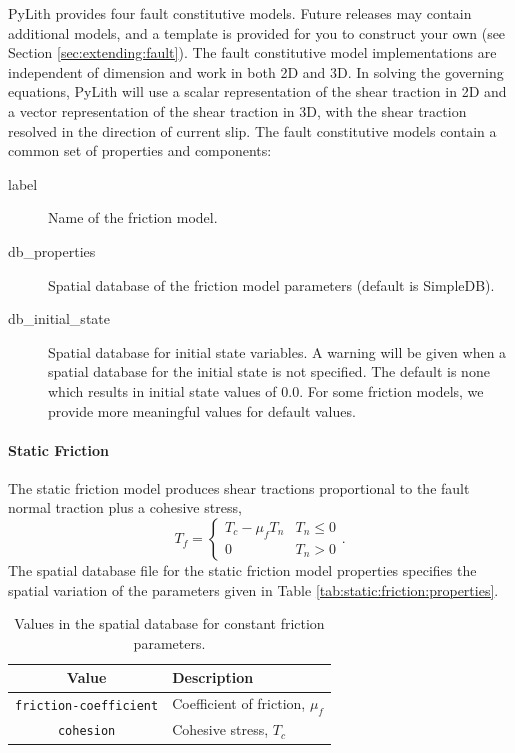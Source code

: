 PyLith provides four fault constitutive models. Future releases may
contain additional models, and a template is provided for you to construct
your own (see Section \vref{sec:extending:fault}).
The fault constitutive model implementations are independent of dimension
and work in both 2D and 3D. In solving the governing equations, PyLith
will use a scalar representation of the shear traction in 2D and a
vector representation of the shear traction in 3D, with the shear
traction resolved in the direction of current slip. The fault constitutive
models contain a common set of properties and components:
\begin{description}
\item [{label}] Name of the friction model.
\item [{db\_properties}] Spatial database of the friction model parameters
(default is SimpleDB).
\item [{db\_initial\_state}] Spatial database for initial state variables.
A warning will be given when a spatial database for the initial state
is not specified. The default is none which results in initial state
values of 0.0. For some friction models, we provide more meaningful
values for default values.
\end{description}

\paragraph{Static Friction}

The static friction model produces shear tractions proportional to
the fault normal traction plus a cohesive stress,
\begin{equation}
T_{f}=\begin{cases}
T_{c}-\mu_{f}T_{n} & T_{n}\leq0\\
0 & T_{n}>0
\end{cases}.
\end{equation}
The spatial database file for the static friction model properties
specifies the spatial variation of the parameters given in Table \vref{tab:static:friction:properties}.

\noindent \begin{center}
\begin{table}[H]
\noindent \centering{}\caption{\label{tab:static:friction:properties}Values in the spatial database
for constant friction parameters.}
\medskip{}
\begin{tabular}{|c|>{\raggedright}p{2.5in}|}
\hline 
\textbf{Value} & \centering{}\textbf{Description}\tabularnewline
\hline 
\hline 
\texttt{friction-coefficient} & \centering{}Coefficient of friction, $\mu_{f}$\tabularnewline
\hline 
\texttt{cohesion} & \centering{}Cohesive stress, $T_{c}$\tabularnewline
\hline 
\end{tabular}
\end{table}

\par\end{center}


